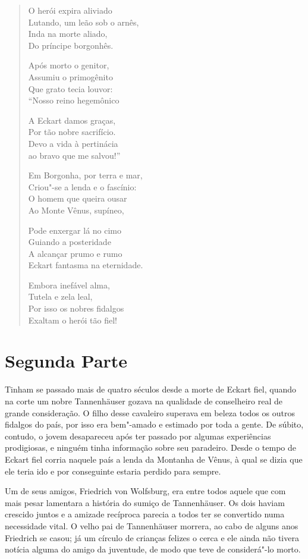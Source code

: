 \begin{verse}
O herói expira aliviado\\
Lutando, um leão sob o arnês,\\
Inda na morte aliado,\\
Do príncipe borgonhês.

Após morto o genitor,\\
Assumiu o primogênito\\
Que grato tecia louvor:\\
``Nosso reino hegemônico
 
A Eckart damos graças,\\
Por tão nobre sacrifício.\\
Devo a vida à pertinácia\\
ao bravo que me salvou!''

Em Borgonha, por terra e mar,\\
Criou"-se a lenda e o fascínio:\\
O homem que queira ousar\\
Ao Monte Vênus, supíneo,

Pode enxergar lá no cimo\\
Guiando a posteridade\\
A alcançar prumo e rumo\\
Eckart fantasma na eternidade.

Embora inefável alma,\\
Tutela e zela leal,\\
Por isso os nobres fidalgos\\
Exaltam o herói tão fiel!
\end{verse}


\section*{Segunda Parte}

Tinham se passado mais de quatro séculos desde a morte de Eckart fiel,
quando na corte um nobre \mbox{Tannenhäuser} gozava na qualidade de
conselheiro real de grande consideração. O filho desse cavaleiro
superava em beleza todos os outros fidalgos do país, por isso era
bem"-amado e estimado por toda a gente. De súbito, contudo, o jovem
desapareceu após ter passado por algumas experiências prodigiosas, e
ninguém tinha informação sobre seu paradeiro. Desde o tempo de Eckart
fiel corria naquele país a lenda da Montanha de Vênus, à qual se dizia
que ele teria ido e por conseguinte estaria perdido para sempre.

Um de seus amigos, Friedrich von Wolfsburg, era entre todos aquele que
com mais pesar lamentara a história do sumiço de Tannenhäuser. Os dois
haviam crescido juntos e a amizade recíproca parecia a todos ter se
convertido numa necessidade vital. O velho pai de Tannenhäuser morrera,
ao cabo de alguns anos Friedrich se casou; já um círculo de crianças
felizes o cerca e ele ainda não tivera notícia alguma do amigo da
juventude, de modo que teve de considerá"-lo morto.

